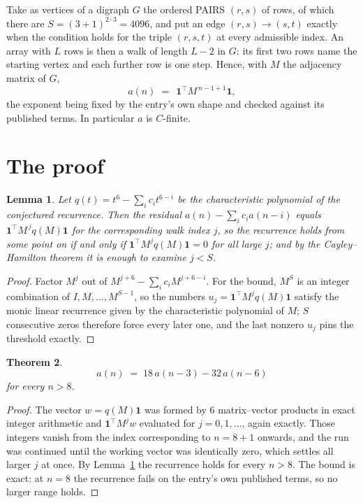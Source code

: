 \documentclass[11pt,a4paper]{article}
\theoremstyle{plain}
\newtheorem{theorem}{Theorem}
\newtheorem{lemma}[theorem]{Lemma}
\theoremstyle{definition}
\begin{document}
Take as vertices of a digraph $G$ the ordered PAIRS $(r,s)$ of rows, of which there are
$S=(3+1)^{2\cdot3}=4096$, and put an edge $(r,s)\to(s,t)$ exactly when the condition
holds for the triple $(r,s,t)$ at every admissible index. An array with $L$ rows is then a
walk of length $L-2$ in $G$: its first two rows name the starting vertex and each further
row is one step. Hence, with $M$ the adjacency matrix of $G$,
\[
a(n)\;=\;\,\mathbf{1}^{\!\top}M^{\,n-1+1}\mathbf{1},
\]
the exponent being fixed by the entry's own shape and checked against its published terms.
In particular $a$ is $C$-finite.

\section{The proof}

\begin{lemma}\label{lem:crit}
Let $q(t)=t^{6}-\sum_i c_it^{6-i}$ be the characteristic polynomial of the
conjectured recurrence. Then the residual $a(n)-\sum_ic_ia(n-i)$ equals
$\mathbf{1}^{\!\top}M^{\,j}q(M)\mathbf{1}$ for the corresponding walk index
$j$, so the recurrence holds from some point on if and only if
$\mathbf{1}^{\!\top}M^{j}q(M)\mathbf{1}=0$ for all large $j$; and by the
Cayley--Hamilton theorem it is enough to examine $j<S$.
\end{lemma}

\begin{proof}
Factor $M^{j}$ out of $M^{j+6}-\sum_ic_iM^{j+6-i}$. For the bound, $M^{S}$
is an integer combination of $I,M,\dots,M^{S-1}$, so the numbers
$u_j=\mathbf{1}^{\!\top}M^{j}q(M)\mathbf{1}$ satisfy the monic linear recurrence given by
the characteristic polynomial of $M$; $S$ consecutive zeros therefore force every later one,
and the last nonzero $u_j$ pins the threshold exactly.
\end{proof}

\begin{theorem}
\[
a(n)\;=\;18\,a(n-3) - 32\,a(n-6)
\]
for every $n>8$.
\end{theorem}

\begin{proof}
The vector $w=q(M)\mathbf{1}$ was formed by $6$ matrix--vector products in exact
integer arithmetic and $\mathbf{1}^{\!\top}M^{j}w$ evaluated for $j=0,1,\dots$, again
exactly. Those integers vanish from the index corresponding to $n=8+1$ onwards, and the
run was continued until the working vector was identically zero, which settles all larger $j$
at once. By Lemma~\ref{lem:crit} the recurrence holds for every $n>8$. The bound is exact: at $n=8$ the recurrence fails on the entry's own published terms, so no larger range holds.
\end{proof}
\end{document}
